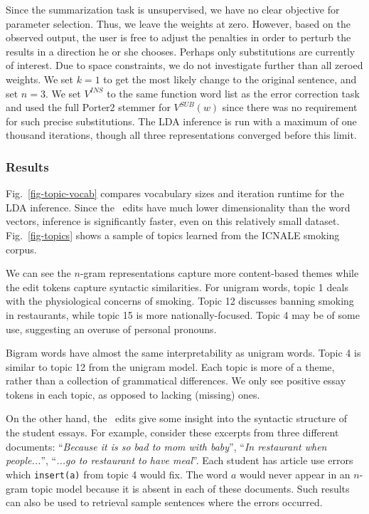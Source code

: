 Since the summarization task is unsupervised, we have no clear objective for
parameter selection. Thus, we leave the weights at zero. However, based on the
observed output, the user is free to adjust the penalties in order to perturb
the results in a direction he or she chooses. Perhaps only substitutions are
currently of interest. Due to space constraints, we do not investigate further
than all zeroed weights. We set $k=1$ to get the most likely change to the
original sentence, and set $n=3$.  We set $V^{INS}$ to the same function word
list as the error correction task and used the full Porter2 stemmer for
$V^{SUB}(w)$ since there was no requirement for such precise substitutions. The
LDA inference is run with a maximum of one thousand iterations, though all three
representations converged before this limit.




\subsubsection{Results}

Fig.~\ref{fig-topic-vocab} compares vocabulary sizes and iteration runtime for
the LDA inference. Since the \sd~edits have much lower dimensionality than the
word vectors, inference is significantly faster, even on this relatively small
dataset. Fig.~\ref{fig-topics} shows a sample of topics learned from the ICNALE
smoking corpus.

We can see the $n$-gram representations capture more content-based themes while
the edit tokens capture syntactic similarities. For unigram words, topic 1
deals with the physiological concerns of smoking. Topic 12 discusses banning
smoking in restaurants, while topic 15 is more nationally-focused. Topic 4 may
be of some use, suggesting an overuse of personal pronouns.

Bigram words have almost the same interpretability as unigram words. Topic 4 is
similar to topic 12 from the unigram model. Each topic is more of a theme,
rather than a collection of grammatical differences. We only see positive essay
tokens in each topic, as opposed to lacking (missing) ones.

On the other hand, the \sd~edits give some insight into the syntactic structure
of the student essays. For example, consider these excerpts from three different
documents: ``\emph{Because it is so bad to mom with baby}'', ``\emph{In
restaurant when people...}'', ``\emph{...go to restaurant to have meal}''. Each
student has article use errors which \texttt{insert(a)} from topic 4 would fix.
The word $a$ would never appear in an $n$-gram topic model because it is absent
in each of these documents. Such results can also be used to retrieval sample sentences
where the errors occurred.

